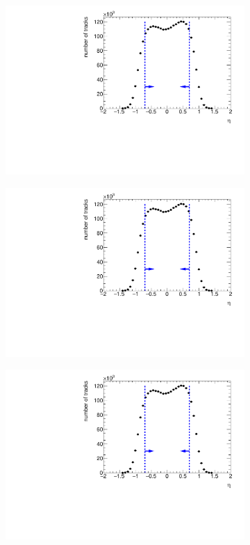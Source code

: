 \begin{figure}[h!]
\begin{subfigure}{.45\textwidth}
	\includegraphics[width=\textwidth, page=3]{chapters/chrgSTAR/img/selection/SDT.pdf}
	\end{subfigure}
	\begin{subfigure}{.45\textwidth}
	\includegraphics[width=\textwidth, page=4]{chapters/chrgSTAR/img/selection/SDT.pdf}
	\end{subfigure}
	\begin{subfigure}{.45\textwidth}
	\includegraphics[width=\textwidth, page=9]{chapters/chrgSTAR/img/selection/SDT.pdf}

\end{subfigure}
\end{figure}
